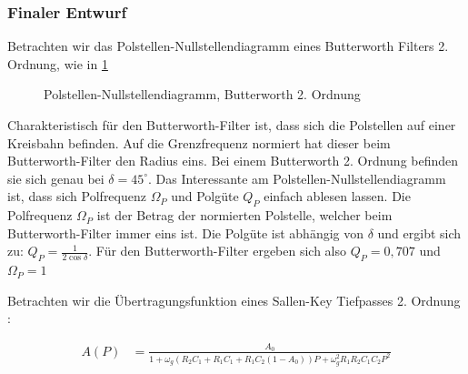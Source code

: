 \subsubsection{Finaler Entwurf}



Betrachten wir das Polstellen-Nullstellendiagramm eines Butterworth Filters 2. Ordnung, wie in \cref{fig:filter_polnul}


\begin{figure}[H]
\centering
{}
\caption{Polstellen-Nullstellendiagramm, Butterworth 2. Ordnung}
\label{fig:filter_polnul}
\end{figure}



Charakteristisch für den Butterworth-Filter ist, dass sich die Polstellen auf einer Kreisbahn befinden. Auf die Grenzfrequenz normiert hat dieser beim Butterworth-Filter den Radius
eins. Bei einem Butterworth 2. Ordnung befinden sie sich genau bei $\delta=45^\circ$. Das Interessante am Polstellen-Nullstellendiagramm ist, dass sich Polfrequenz $\Omega_P$ und 
Polgüte $Q_P$ einfach ablesen lassen. Die Polfrequenz $\Omega_P$ ist der Betrag der normierten Polstelle, welcher beim Butterworth-Filter immer eins ist.
Die Polgüte ist abhängig von $\delta$ und ergibt sich zu: $Q_P=\frac{1}{2\cos{\delta}}$. Für den Butterworth-Filter ergeben sich also $Q_P=0,707$ und $\Omega_P=1$

Betrachten wir die Übertragungsfunktion eines Sallen-Key Tiefpasses 2. Ordnung \cite[S. 101]{Krucker2000}:

\begin{align*}
A(P)&=\frac{A_0}{1+\omega_g (R_2 C_1 + R_1 C_1 + R_1 C_2(1-A_0))P + \omega_g^2R_1 R_2 C_1C_2P^2}
\end{align*}

